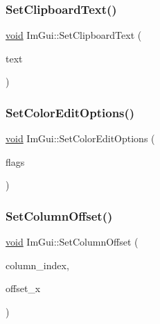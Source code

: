\subsubsection{\texorpdfstring{Set\+Clipboard\+Text()}{SetClipboardText()}}
{\footnotesize\ttfamily \hyperlink{imgui__impl__opengl3__loader_8h_ac668e7cffd9e2e9cfee428b9b2f34fa7}{void} Im\+Gui\+::\+Set\+Clipboard\+Text (\begin{DoxyParamCaption}\item[{const char $\ast$}]{text }\end{DoxyParamCaption})}

\mbox{\label{namespaceImGui_ac768151f2ac6c7d79b31b934cc0e9d05}} 
\subsubsection{\texorpdfstring{Set\+Color\+Edit\+Options()}{SetColorEditOptions()}}
{\footnotesize\ttfamily \hyperlink{imgui__impl__opengl3__loader_8h_ac668e7cffd9e2e9cfee428b9b2f34fa7}{void} Im\+Gui\+::\+Set\+Color\+Edit\+Options (\begin{DoxyParamCaption}\item[{Im\+Gui\+Color\+Edit\+Flags}]{flags }\end{DoxyParamCaption})}

\mbox{\label{namespaceImGui_a8cc207211d6cf3f77b505e24aed4ebcc}} 
\subsubsection{\texorpdfstring{Set\+Column\+Offset()}{SetColumnOffset()}}
{\footnotesize\ttfamily \hyperlink{imgui__impl__opengl3__loader_8h_ac668e7cffd9e2e9cfee428b9b2f34fa7}{void} Im\+Gui\+::\+Set\+Column\+Offset (\begin{DoxyParamCaption}\item[{int}]{column\+\_\+index,  }\item[{float}]{offset\+\_\+x }\end{DoxyParamCaption})}

\mbox{\label{namespaceImGui_af17222ec47aebb5ede00be7b52de9f5d}} 
